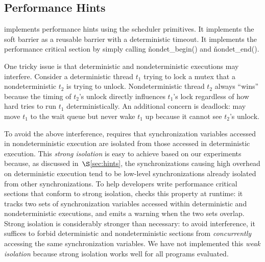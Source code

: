
\subsection{Performance Hints} \label{sec:hints-impl}



\parrot implements performance hints using the scheduler primitives.  It
implements the soft barrier as a reusable barrier with a deterministic
timeout.  It implements the performance critical section by simply calling
\v{nondet\_begin()} and \v{nondet\_end()}.

One tricky issue is that deterministic and nondeterministic executions may
interfere.  Consider a deterministic thread $t_1$ trying to lock a mutex
that a nondeterministic $t_2$ is trying to unlock.
Nondeterministic thread $t_2$ always ``wins'' because the timing of
$t_2$'s unlock directly influences $t_1$'s lock regardless of how hard
\parrot tries to run $t_1$ deterministically.  An additional concern is
deadlock: \parrot may move $t_1$ to the wait queue but never wake $t_1$ up
because it cannot see  $t_2$'s unlock.

To avoid the above interference, \parrot requires that synchronization variables accessed
in nondeterministic execution are isolated from those accessed in
deterministic execution.  This \emph{strong isolation} is easy to achieve based
on our experiments because, as discussed in~$\S$\ref{sec:hints}, the
synchronizations causing high overhead on deterministic execution tend to
be low-level synchronizations already isolated from other
synchronizations. To help developers write performance critical sections
that conform to strong isolation, \parrot checks this property at runtime:
it tracks two sets of synchronization variables accessed within
deterministic and nondeterministic executions, and emits a warning when the
two sets overlap.  Strong isolation is considerably stronger than
necessary: to avoid interference, it suffices to forbid
deterministic and nondeterministic sections from \emph{concurrently}
accessing the same synchronization variables.  We have not implemented
this \emph{weak isolation} because strong isolation works well for all
programs evaluated.

